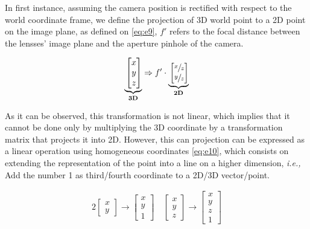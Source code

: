 \documentclass{article}
\begin{document}
In first instance, assuming the camera position is rectified with respect to the world coordinate frame, we define the projection of 3D world point to a 2D point on the image plane, as defined on  \eqref{eq:e9}, $f'$ refers to the focal distance between the lensses' image plane and the aperture pinhole of the camera.

\begin{alignat}{2}
\underbrace{\vphantom{\begin{bmatrix}n^2 \\ n^3 \end{bmatrix}}\begin{bmatrix}
x  \\
y  \\
z
\end{bmatrix}}_{\mathbf{3D}} \Rightarrow f' \cdot 
\underbrace{\vphantom{\begin{bmatrix}n^2 \\ n^3 \end{bmatrix}}\begin{bmatrix}
\sfrac{x}{z}  \\
\sfrac{y}{z}
\end{bmatrix}}_{\mathbf{2D}} \label{eq:e9}
\end{alignat}

As it can be observed, this transformation is not linear, which implies that it cannot be done only by multiplying the 3D coordinate by a transformation matrix that projects it into 2D. However, this can projection can be expressed as a linear operation using homogeneous coordinates \eqref{eq:e10}, which consists on extending the representation of the point into a line on a higher dimension, \textit{i.e.,} Add the number 1 as third/fourth coordinate to a 2D/3D vector/point. 

\begin{alignat}{2}
\begin{bmatrix}
x  \\
y
\end{bmatrix} \rightarrow
\begin{bmatrix}
x  \\
y  \\
1
\end{bmatrix} \quad
\begin{bmatrix}
x  \\
y  \\
z
\end{bmatrix} \rightarrow
\begin{bmatrix}
x  \\
y  \\
z  \\
1
\end{bmatrix} \label{eq:e10}
\end{alignat}
\end{document}
